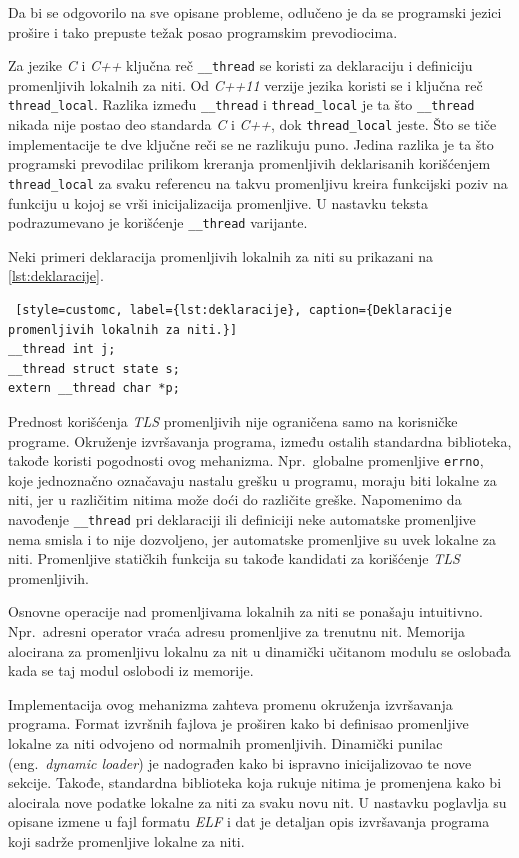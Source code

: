 \documentclass[12pt,oneside]{memoir}
\begin{document}
Da bi se odgovorilo na sve opisane probleme, odlučeno je da se programski jezici prošire i tako prepuste težak posao programskim prevodiocima.

Za jezike \emph{C} i \emph{C++} ključna reč \texttt{\_\_thread} se koristi za deklaraciju i definiciju promenljivih lokalnih za niti. Od \emph{C++11} verzije jezika koristi se i ključna reč \texttt{thread\_local}. Razlika između \texttt{\_\_thread} i \texttt{thread\_local} je ta što \texttt{\_\_thread} nikada nije postao deo standarda \emph{C} i \emph{C++}, dok \texttt{thread\_local} jeste. Što se tiče implementacije te dve ključne reči se ne razlikuju puno. Jedina razlika je ta što programski prevodilac prilikom kreranja promenljivih deklarisanih korišćenjem \texttt{thread\_local} za svaku referencu na takvu promenljivu kreira funkcijski poziv na funkciju u kojoj se vrši inicijalizacija promenljive. U nastavku teksta podrazumevano je korišćenje \texttt{\_\_thread} varijante.

Neki primeri deklaracija promenljivih lokalnih za niti su prikazani na \ref{lst:deklaracije}.

\begin{lstlisting} [style=customc, label={lst:deklaracije}, caption={Deklaracije promenljivih lokalnih za niti.}]
__thread int j;
__thread struct state s;
extern __thread char *p;
\end{lstlisting}

Prednost korišćenja \emph{TLS} promenljivih nije ograničena samo na korisničke programe. Okruženje izvršavanja programa, između ostalih standardna biblioteka, takođe koristi pogodnosti ovog mehanizma. Npr.~globalne promenljive \texttt{errno}, koje jednoznačno označavaju nastalu grešku u programu, moraju biti lokalne za niti, jer u različitim nitima može doći do različite greške. Napomenimo da navođenje \texttt{\_\_thread} pri deklaraciji ili definiciji neke automatske promenljive nema smisla i to nije dozvoljeno, jer automatske promenljive su uvek lokalne za niti. Promenljive statičkih funkcija su takođe kandidati za korišćenje \emph{TLS} promenljivih.

Osnovne operacije nad promenljivama lokalnih za niti se ponašaju intuitivno. Npr.~adresni operator vraća adresu promenljive za trenutnu nit. Memorija alocirana za promenljivu lokalnu za nit u dinamički učitanom modulu se oslobađa kada se taj modul oslobodi iz memorije.

Implementacija ovog mehanizma zahteva promenu okruženja izvršavanja programa. Format izvršnih fajlova je proširen kako bi definisao promenljive lokalne za niti odvojeno od normalnih promenljivih. Dinamički punilac (eng.~\emph{dynamic loader}) je nadograđen kako bi ispravno inicijalizovao te nove sekcije. Takođe, standardna biblioteka koja rukuje nitima je promenjena kako bi alocirala nove podatke lokalne za niti za svaku novu nit. U nastavku poglavlja su opisane izmene u fajl formatu
\emph{ELF} i dat je detaljan opis izvršavanja programa koji sadrže promenljive lokalne za niti.
\end{document}
